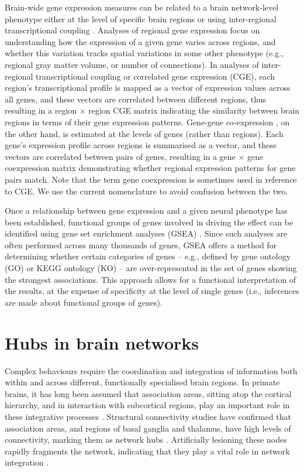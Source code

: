 Brain-wide gene expression measures can be related to a brain network-level phenotype either at the level of specific brain regions \citep{Myers2007,Rittman2016,Vertes2016b,Parkes2017} or using inter-regional transcriptional coupling \citep{Richiardi2015,Fulcher2016,Arnatkeviciute2018,Romero-Garcia2018}. Analyses of regional gene expression focus on understanding how the expression of a given gene varies across regions, and whether this variation tracks spatial variations in some other phenotype (e.g., regional gray matter volume, or number of connections). In analyses of inter-regional transcriptional coupling or correlated gene expression (CGE), each region’s transcriptional profile is mapped as a vector of expression values across all genes, and these vectors are correlated between different regions, thus resulting in a region $\times$ region CGE matrix indicating the similarity between brain regions in terms of their gene expression patterns. Gene-gene co-expression \citep{Eising2016,Keo2017,Negi2017}, on the other hand, is estimated at the levels of genes (rather than regions). Each gene’s expression profile across regions is summarised as a vector, and these vectors are correlated between pairs of genes, resulting in a gene $\times$ gene coexpression matrix demonstrating whether regional expression patterns for gene pairs match. Note that the term gene coexpression is sometimes used in reference to CGE. We use the current nomenclature to avoid confusion between the two.

Once a relationship between gene expression and a given neural phenotype has been established, functional groups of genes involved in driving the effect can be identified using gene set enrichment analyses (GSEA) \citep{Subramanian2005,Irizarry2009}.
Since such analyses are often performed across many thousands of genes, GSEA offers a method for determining whether certain categories of genes -- e.g., defined by gene ontology (GO) \citep{Ashburner2000} or KEGG ontology (KO) \citep{Kanehisa2000} -- are over-represented in the set of genes showing the strongest associations. This approach allows for a functional interpretation of the results, at the expense of specificity at the level of single genes (i.e., inferences are made about functional groups of genes).

\section{Hubs in brain networks}

Complex behaviours require the coordination and integration of information both within and across different, functionally specialised brain regions. In primate brains, it has long been assumed that association areas, sitting atop the cortical hierarchy, and in interaction with subcortical regions, play an important role in these integrative processes \citep{Felleman,Mesulam1998,Meyer2009a}.
Structural connectivity  studies have confirmed that association areas, and regions of basal ganglia and thalamus, have high levels of connectivity, marking them as network hubs \citep{VandenHeuvel2011}.
Artificially lesioning these nodes rapidly fragments the network, indicating that they play a vital role in network integration \citep{Albert2000,VandenHeuvel2011}.

